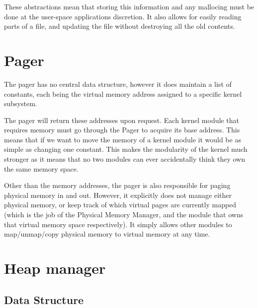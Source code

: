 \documentclass[a4paper]{report}
\begin{document}
These abstractions mean that storing this information and any mallocing must be done at the user-space applications discretion. It also allows for easily reading parts of a file, and updating the file without destroying all the old contents.




















\section{Pager}

The pager has no central data structure, however it does maintain a list of constants, each being the virtual memory address assigned to a specific kernel subsystem.

The pager will return these addresses upon request. Each kernel module that requires memory must go through the Pager to acquire its base address. This means that if we want to move the memory of a kernel module it would be as simple as changing one constant. This makes the modularity of the kernel much stronger as it means that no two modules can ever accidentally think they own the same memory space.

Other than the memory addresses, the pager is also responsible for paging physical memory in and out. However, it explicitly does not manage either physical memory, or keep track of which virtual pages are currently mapped (which is the job of the Physical Memory Manager, and the module that owns that virtual memory space respectively). It simply allows other modules to map/unmap/copy physical memory to virtual memory at any time.











\clearpage

\section{Heap manager}

\subsection{Data Structure}
\end{document}
